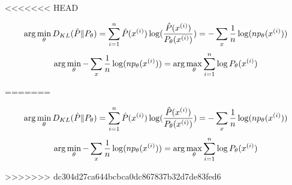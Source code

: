 <<<<<<< HEAD
\begin{answer}
$$ \arg\min_\theta D_{KL}(\hat{P}\|P_\theta)  =\sum_{i=1}^{{n}} \hat{P}(x^{(i)}) \log(\frac{ \hat{P}(x^{(i)})}{P_\theta(x^{(i)})}) = -\sum_x \frac{1}{n} \log(n p_\theta(x^{(i)})) $$
$$\arg\min_\theta  -\sum_x \frac{1}{n} \log(n p_\theta(x^{(i)})) = \arg\max_\theta \sum_{i=1}^{{n}} \log P_\theta(x^{(i)})$$
\end{answer}
=======
\begin{answer}
$$ \arg\min_\theta D_{KL}(\hat{P}\|P_\theta)  =\sum_{i=1}^{{n}} \hat{P}(x^{(i)}) \log(\frac{ \hat{P}(x^{(i)})}{P_\theta(x^{(i)})}) = -\sum_x \frac{1}{n} \log(n p_\theta(x^{(i)})) $$
$$\arg\min_\theta  -\sum_x \frac{1}{n} \log(n p_\theta(x^{(i)})) = \arg\max_\theta \sum_{i=1}^{{n}} \log P_\theta(x^{(i)})$$
\end{answer}
>>>>>>> dc304d27ca644bcbca0dc867837b32d7de83fed6
